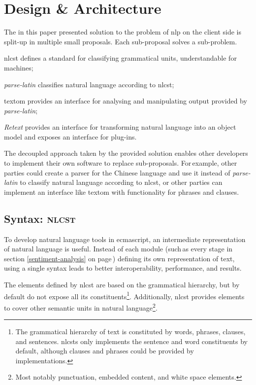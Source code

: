\chapter{Design \& Architecture}\label{design}

The in this paper presented solution to the problem of \gls{nlp} on the
  client side is split-up in multiple small proposals.
Each sub-proposal solves a sub-problem.

\begin{aenumerate}
\item\acrshort{nlcst} defines a standard for classifying grammatical units,
  understandable for machines;
\item\emph{parse-latin} classifies natural language according to
  \acrshort{nlcst};
\item\gls{textom} provides an interface for analysing and manipulating output
  provided by \emph{parse-latin};
\item\emph{Retext} provides an interface for transforming natural language
  into an object model and exposes an interface for plug-ins.
\end{aenumerate}

\noindent The decoupled approach taken by the provided solution enables other
  developers to implement their own software to replace sub-proposals.
For\,example, other parties could create a parser for the Chinese language and
  use it instead of \emph{parse-latin} to classify natural language according
  to \gls{nlcst}, or other parties can implement an interface like
  \gls{textom} with functionality for phrases and clauses.

\section{Syntax: \textsc{nlcst}}\label{syntax}

To develop natural language tools in \gls{ecmascript}, an intermediate
  representation of natural language is useful.
Instead of each module (such\,as every stage in section
  \ref{sentiment-analysis} on page\,\pageref{sentiment-analysis})
  defining its own representation of text, using a single syntax leads to
  better interoperability, performance, and results.

The elements defined by \acrfull{nlcst} are based on the grammatical
  hierarchy, but by default do not expose all its constituents\footnote{The
      grammatical hierarchy of text is constituted by words, phrases,
      clauses, and sentences.
    \glspl{nlcst} only implements the sentence and word constituents
    by default, although clauses and phrases could be provided by
    implementations.}.
Additionally, \gls{nlcst} provides elements to cover other semantic units in
  natural language\footnote{Most
    notably punctuation, embedded content, and white space elements.}.


